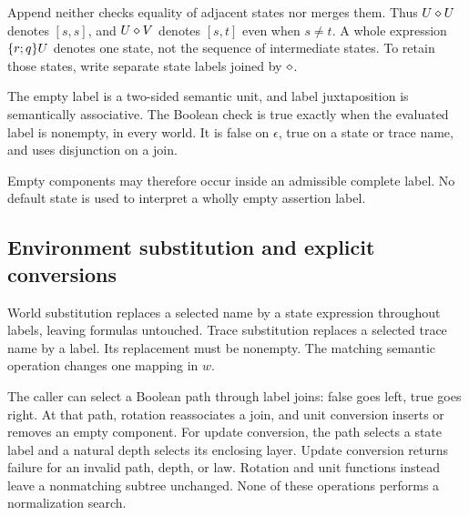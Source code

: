 Append neither checks equality of adjacent states nor merges them. Thus
$U\mathbin{\diamond} U$ denotes $[s,s]$, and $U\mathbin{\diamond} V$ denotes $[s,t]$ even when
$s\ne t$. A whole expression $\{r;q\}U$ denotes one state, not the
sequence of intermediate states. To retain those states, write separate
state labels joined by $\mathbin{\diamond}$.

\begin{proposition}
The empty label is a two-sided semantic unit, and label juxtaposition is
semantically associative. The Boolean check  is true
exactly when the evaluated label is nonempty, in every world.
It is false on $\epsilon$, true on a state or trace name, and uses disjunction
on a join.
\end{proposition}

Empty components may therefore occur inside an admissible complete label.
No default state is used to interpret a wholly empty assertion label.

\subsection{Environment substitution and explicit conversions}
World substitution replaces a selected  name by a state expression
throughout labels, leaving formulas untouched. Trace substitution replaces a
selected trace name by a label. Its replacement must be nonempty. The matching
semantic operation changes one mapping in $w$.

The caller can select a Boolean path through label joins: false goes left,
true goes right. At that path, rotation reassociates a join, and unit
conversion inserts or removes an empty component. For update conversion,
the path selects a state label and a natural depth selects its enclosing
 layer. Update conversion returns failure for an invalid path,
depth, or law. Rotation and unit functions instead leave a nonmatching
subtree unchanged. None of these operations performs a normalization search.

